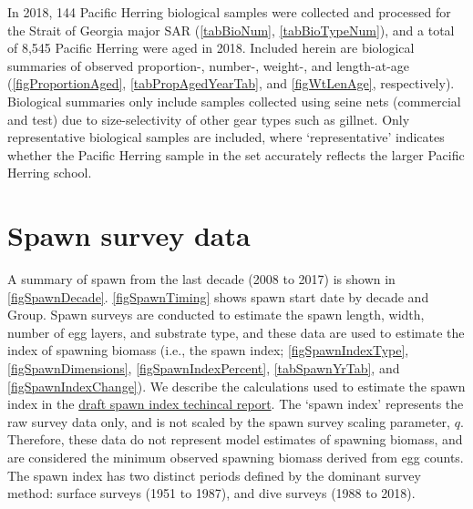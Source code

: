 \documentclass[12pt]{article}\usepackage[]{graphicx}\usepackage[]{color}
\newcommand{\regionName}{Strait of Georgia}
\newcommand{\regionType}{major}
\newcommand{\thisYr}{2018}
\newcommand{\fishName}{Pacific Herring}
\newcommand{\seineSamples}{Biological summaries only include samples collected using seine nets (commercial and test) due to size-selectivity of other gear types such as gillnet.}
\newcommand{\repSamples}{Only representative biological samples are included, where `representative' indicates whether the \fishName{} sample in the set accurately reflects the larger \fishName{} school.}
\newcommand{\spawnIndex}{The `spawn index' represents the raw survey data only, and is not scaled by the spawn survey scaling parameter, $q$.}
\newcommand{\qPeriods}{The spawn index has two distinct periods defined by the dominant survey method: surface surveys (1951 to 1987), and dive surveys (1988 to 2018).}
\begin{document}
In \thisYr{}, 144 \fishName{} biological samples were collected and processed for the \regionName{} \regionType{} SAR (\autoref{tabBioNum}, \autoref{tabBioTypeNum}), and a total of 8,545 \fishName{} were aged in \thisYr{}. 
\iftoggle{numPropWtAge}{Differences between biological data collected from two sampling protocols regarding the number-, proportion-, weight-, and length-at-age for \fishName{} in \thisYr{} in the \regionName{} \regionType{} SAR are shown in \autoref{tabDeltaNumAgeYr}, \autoref{tabDeltaPropAgeYr}, \autoref{tabDeltaWtAgeYr}, and \autoref{tabDeltaLenAgeYr}, respectively.
The nearshore sampling program is a multi-year pilot study (using cast nets), therefore only biological data from the seine samples were used for the purposes of stock assessment.}{\unskip}
\iftoggle{biosamples}{The locations in which the biological samples were collected are presented in \autoref{figBioLocations}.}{\unskip}
\iftoggle{weightCatch}{Biological samples collected using seine gear shows that there is considerable variability in fish weight by year and sample type (\autoref{figWeightCatch}).}{\unskip}
Included herein are biological summaries of observed proportion-, number-, weight-, and length-at-age (\autoref{figProportionAged}, \autoref{tabPropAgedYearTab}, and \autoref{figWtLenAge}, respectively).
\iftoggle{weightGroup}{Some Statistical Areas tend to have larger fish at a given age (\autoref{figWeightAgeGroup}, \autoref{tabWeightAgeGroupN}).}{\unskip}
\seineSamples{}
\repSamples{}

\section{Spawn survey data}

\iftoggle{spawnByLoc}{\fishName{} spawn surveys were conducted at 32 individual locations in \thisYr{} in the \regionName{} \regionType{} SAR (\autoref{tabSpawnByLoc}\iftoggle{spawnByLocXY}{, and \autoref{figSpawnByLoc}}{\unskip}).}
{No spawn surveys were conducted in \thisYr{} in the \regionName{} \regionType{} SAR.}
A summary of spawn from the last decade (2008 to 2017) is shown in \autoref{figSpawnDecade}.
\autoref{figSpawnTiming} shows spawn start date by decade and Group.
Spawn surveys are conducted to estimate the spawn length, width, number of egg layers, and substrate type, and these data are used to estimate the index of spawning biomass (i.e., the spawn index; \autoref{figSpawnIndexType}, \autoref{figSpawnDimensions}, \autoref{figSpawnIndexPercent}, \autoref{tabSpawnYrTab}, and \autoref{figSpawnIndexChange}).
We describe the calculations used to estimate the spawn index in the \href{https://github.com/grinnellm/HerringSpawnDocumentation/blob/master/SpawnIndexTechnicalReport.pdf}{draft spawn index techincal report}.
\iftoggle{spawnDepth}{In addition, spawn surveys estimate spawn depth by Statistical Area, and Section (\autoref{figSpawnDepth}).}{\unskip}
\spawnIndex{}
Therefore, these data do not represent model estimates of spawning biomass, and are considered the minimum observed spawning biomass derived from egg counts.
\qPeriods{}
\end{document}
